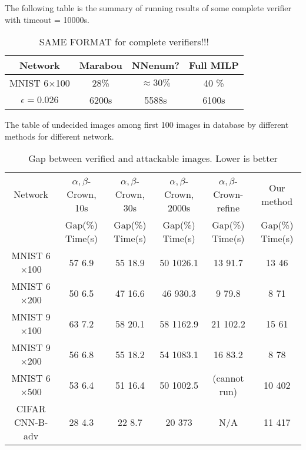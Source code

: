 \vspace*{4ex}


The following table is the summary of running results of some complete verifier with timeout = 10000s. 

\begin{table}
	\centering
	\caption{SAME FORMAT for complete verifiers!!!}
	\label{table_complete}
	\begin{tabular}{||c||c|c|c||}
		\hline
		Network &  Marabou  & NNenum?&  Full MILP  \\ \hline
		MNIST 6$\times$100 & 28\% & $\approx 30\%$ & 40 \%    \\ \hline
		$\epsilon = 0.026$ & 6200s &  5588s & 6100s
		  \\  \hline
	\end{tabular}
\end{table}


\vspace*{4ex}

The table of undecided images among first 100 images in database by different methods for different network.


\begin{table}
	\centering
	\caption{Gap between verified and attackable images. Lower is better}
	\label{table_undecided}
	\begin{tabular}{|c|c|c|c|c|c|}
		\hline
		Network & $\alpha,\beta$-Crown, 10s & $\alpha,\beta$-Crown, 30s & $\alpha,\beta$-Crown, 2000s & $\alpha,\beta$-Crown-refine & Our method \\ 
		& Gap(\%) \hfill Time(s) & Gap(\%) \hfill Time(s) & Gap(\%) \hfill Time(s) & Gap(\%) \hfill Time(s) & Gap(\%) \hfill Time(s)\\ \hline
		MNIST 6$\times$100 & 57 \hfill 6.9 & 55 \hfill 18.9 & 50 \hfill 1026.1 & 13 \hfill 91.7 & 13 \hfill 46 \\ \hline
		MNIST 6$\times$200 & 50 \hfill 6.5 & 47 \hfill 16.6 & 46 \hfill 930.3 & 9 \hfill 79.8 & 8 \hfill 71 \\ \hline
		MNIST 9$\times$100 & 63 \hfill 7.2 & 58 \hfill 20.1 & 58 \hfill 1162.9 & 21 \hfill 102.2 & 15 \hfill 61 \\ \hline
		MNIST 9$\times$200 & 56 \hfill 6.8 & 55 \hfill 18.2 & 54 \hfill 1083.1 & 16 \hfill 83.2 & 8 \hfill 78 \\ \hline
		MNIST 6$\times$500 & 53 \hfill 6.4 & 51 \hfill 16.4 & 50 \hfill 1002.5 & (cannot run) & 10 \hfill 402 \\ \hline
		CIFAR CNN-B-adv & 28 \hfill 4.3 & 22 \hfill 8.7 & 20 \hfill 373 & N/A & 11 \hfill 417 \\ \hline
	\end{tabular}
\end{table}